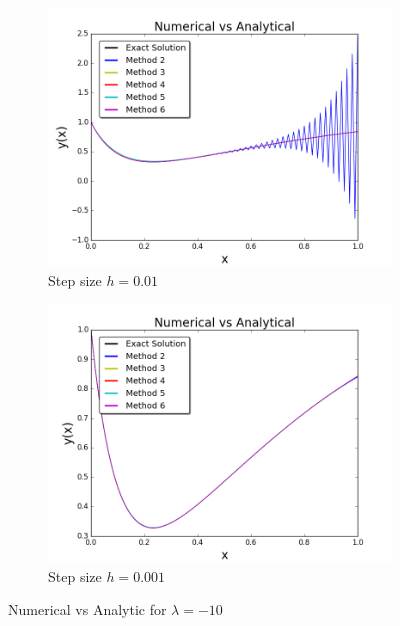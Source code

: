 \documentclass[12pt]{article}
\theoremstyle{remark}
\begin{document}
\begin{figure}[H]
	\centering
	\begin{subfigure}{.55\textwidth}
		\centering
		\includegraphics[width=1\linewidth]{reg_-10_01.png}
		\caption{Step size $h = 0.01$}
		\label{fig:sub1}
	\end{subfigure}%
	\begin{subfigure}{.55\textwidth}
		\centering
		\includegraphics[width=1\linewidth]{reg_-10_001.png}
		\caption{Step size $h = 0.001$}
		\label{fig:sub2}
	\end{subfigure}
	\caption{Numerical vs Analytic for $\lambda = -10$}
	\label{fig:test}
\end{figure}
\end{document}

